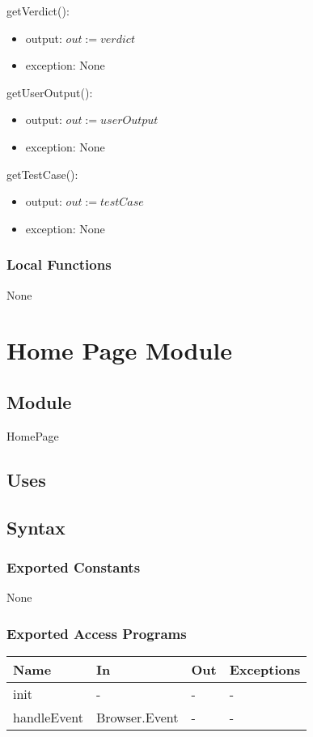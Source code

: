 \documentclass[12pt, titlepage]{article}
\begin{document}
\noindent getVerdict():
\begin{itemize}
\item output: $out := verdict$
\item exception: None
\end{itemize}

\noindent getUserOutput():
\begin{itemize}
\item output: $out := userOutput$
\item exception: None
\end{itemize}

\noindent getTestCase():
\begin{itemize}
\item output: $out := testCase$
\item exception: None
\end{itemize}

\subsubsection{Local Functions}
None
\newpage

\section{Home Page Module} \label{HomePage} 
\subsection{Module}
HomePage
\subsection{Uses}

\subsection{Syntax}

\subsubsection{Exported Constants}
None
\subsubsection{Exported Access Programs}
\begin{center}
\begin{tabular}{p{2cm} p{4cm} p{4cm} p{2cm}}
\hline
\textbf{Name} & \textbf{In} & \textbf{Out} & \textbf{Exceptions} \\
\hline
init & - & - & - \\
handleEvent & Browser.Event & - & -\\
\hline
\end{tabular}
\end{center}
\end{document}
